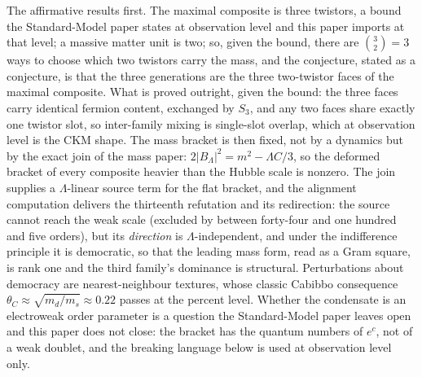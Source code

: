 \documentclass[11pt]{article}
\theoremstyle{definition}
\theoremstyle{plain}
\begin{document}
The affirmative results first. The maximal composite is three twistors, a bound the Standard-Model paper states at observation level and this paper imports at that level; a massive matter unit is two; so, given the bound, there are $\binom{3}{2} = 3$ ways to choose which two twistors carry the mass, and the conjecture, stated as a conjecture, is that the three generations are the three two-twistor faces of the maximal composite. What is proved outright, given the bound: the three faces carry identical fermion content, exchanged by $S_{3}$, and any two faces share exactly one twistor slot, so inter-family mixing is single-slot overlap, which at observation level is the CKM shape. The mass bracket is then fixed, not by a dynamics but by the exact join of the mass paper: $2|B_{\Lambda}|^{2} = m^{2} - \Lambda C/3$, so the deformed bracket of every composite heavier than the Hubble scale is nonzero. The join supplies a $\Lambda$-linear source term for the flat bracket, and the alignment computation delivers the thirteenth refutation and its redirection: the source cannot reach the weak scale (excluded by between forty-four and one hundred and five orders), but its \emph{direction} is $\Lambda$-independent, and under the indifference principle it is democratic, so that the leading mass form, read as a Gram square, is rank one and the third family's dominance is structural. Perturbations about democracy are nearest-neighbour textures, whose classic Cabibbo consequence $\theta_{C} \approx \sqrt{m_{d}/m_{s}} \approx 0.22$ passes at the percent level. Whether the condensate is an electroweak order parameter is a question the Standard-Model paper leaves open and this paper does not close: the bracket has the quantum numbers of $e^{c}$, not of a weak doublet, and the breaking language below is used at observation level only.
\end{document}
